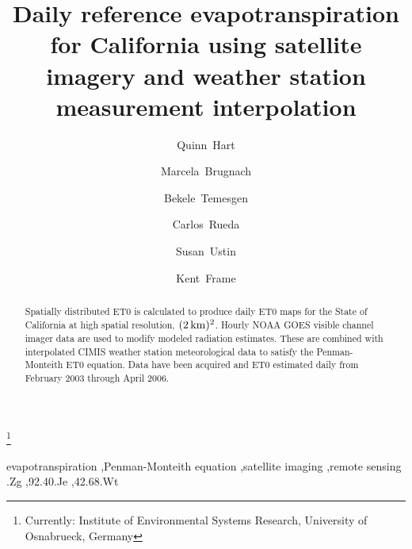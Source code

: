 \documentclass[reviewcopy]{elsart}
\begin{document}
%
\begin{frontmatter}
  \title{Daily reference evapotranspiration for California using
    satellite imagery and weather station measurement interpolation}
%
\author[calspace]{Quinn~Hart}
\author[calspace]{Marcela~Brugnach}
\author[cimis]{Bekele~Temesgen}
\author[calspace]{Carlos~Rueda}
\author[calspace]{Susan~Ustin}
\author[cimis]{Kent~Frame}

\address[calspace]{CalSpace, University of California, Davis, Davis, CA, USA }

\thanks[marcela]{Currently: Institute of Environmental Systems
  Research, University of Osnabrueck, Germany }

\address[cimis]{California Irrigation Management Information System
  (CIMIS), California Department of Water Resources, Sacramento, CA,
  USA }

\begin{abstract}
  Spatially distributed \ac{ET0} is calculated to produce daily
  \ac{ET0} maps for the State of California at high spatial
  resolution, $(\unit[2]{km})^2$.  Hourly \acs{NOAA} \acs{GOES} visible
  channel imager data are used to modify modeled radiation estimates.
  These are combined with interpolated \acf{CIMIS} weather station
  meteorological data to satisfy the Penman-Monteith \ac{ET0}
  equation.  Data have been acquired and \ac{ET0} estimated daily from
  February 2003 through April 2006.
\end{abstract}

\begin{keyword}
  evapotranspiration \sep Penman-Monteith equation \sep satellite
  imaging \sep remote sensing
.Zg \sep 92.40.Je \sep 42.68.Wt
\end{keyword}
\end{frontmatter}                                

\end{document}
